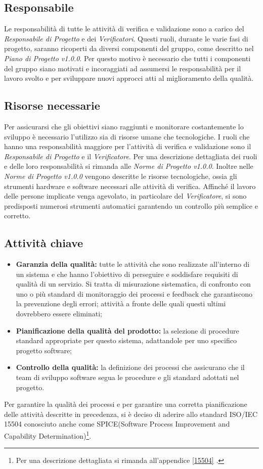 \subsection{Responsabile}
Le responsabilità di tutte le attività di verifica e validazione sono a carico del \textit{Responsabile di Progetto} e dei \textit{Verificatori}. Questi ruoli, durante le varie fasi di progetto, saranno ricoperti da diversi componenti del gruppo, come descritto nel \textit{Piano di Progetto v1.0.0}. Per questo motivo è necessario che tutti i componenti del gruppo siano motivati e incoraggiati ad assumersi le responsabilità per il lavoro svolto e per sviluppare nuovi approcci atti al miglioramento della qualità.

\subsection{Risorse necessarie}
Per assicurarsi che gli obiettivi siano raggiunti e monitorare costantemente lo sviluppo è necessario l'utilizzo sia di risorse umane che tecnologiche. I ruoli che hanno una responsabilità maggiore per l'attività di verifica e validazione sono il \textit{Responsabile di Progetto} e il \textit{Verificatore}. Per una descrizione dettagliata dei ruoli e delle loro responsabilità si rimanda alle \textit{Norme di Progetto v1.0.0}. Inoltre nelle \textit{Norme di Progetto v1.0.0} vengono descritte le risorse tecnologiche, ossia gli strumenti hardware e software necessari alle attività di verifica. Affinché il lavoro delle persone implicate venga agevolato, in particolare del \textit{Verificatore}, si sono predisposti numerosi strumenti automatici garantendo un controllo più semplice e corretto.

\subsection{Attività chiave}
\begin{itemize}
	\item \textbf{Garanzia della qualità:} tutte le attività che sono realizzate all'interno di un sistema e che hanno l'obiettivo di perseguire e soddisfare requisiti di qualità di un servizio. Si tratta di misurazione sistematica, di confronto con uno o più standard di monitoraggio dei processi e \gls{feedback} che garantiscono la prevenzione degli errori; attività a fronte delle quali questi ultimi dovrebbero essere eliminati;
	\item \textbf{Pianificazione della qualità del prodotto:} la selezione di procedure standard appropriate per questo sistema, adattandole per uno specifico progetto software;
	\item \textbf{Controllo della qualità:} la definizione dei processi che assicurano che il team  di sviluppo software segua le procedure e gli standard adottati nel progetto.
\end{itemize}
Per garantire la qualità dei processi e per garantire una corretta pianificazione delle attività descritte in precedenza, si è deciso di aderire allo standard ISO/IEC 15504 conosciuto anche come SPICE(Software Process Improvement and Capability Determination)\footnote{Per una descrizione dettagliata si rimanda all'appendice \ref{15504} .}.

